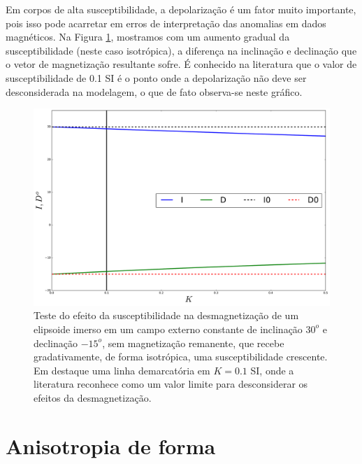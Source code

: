 Em corpos de alta susceptibilidade, a depolarização é um fator muito importante, pois isso pode acarretar em erros de interpretação das anomalias em dados magnéticos. Na Figura \ref{fig:test_k_triaxial}, mostramos com um aumento gradual da susceptibilidade (neste caso isotrópica), a diferença na inclinação e declinação que o vetor de magnetização resultante sofre. É conhecido na literatura que o valor de susceptibilidade de 0.1 SI é o ponto onde a depolarização não deve ser desconsiderada na modelagem, o que de fato observa-se neste gráfico.

\begin{figure}[hbt!]
	\centering \includegraphics[width=15 cm,height=10 cm]{figures/test_k_triaxial}
	\caption[Teste do efeito da susceptibilidade na desmagnetização de um elipsoide imerso em um campo externo constante de inclinação 
		$30^{o}$ e declinação $-15^{o}$.]{Teste do efeito da susceptibilidade na desmagnetização de um elipsoide imerso em um campo externo constante de inclinação	$30^{o}$ e declinação $-15^{o}$, sem magnetização remanente, que recebe gradativamente, de forma isotrópica,
		uma susceptibilidade crescente. Em destaque uma linha demarcatória em $K=0.1$ SI, onde a literatura reconhece como um valor limite 
		para desconsiderar os efeitos da desmagnetização.}
	\label{fig:test_k_triaxial}
\end{figure}

\section{Anisotropia de forma}

